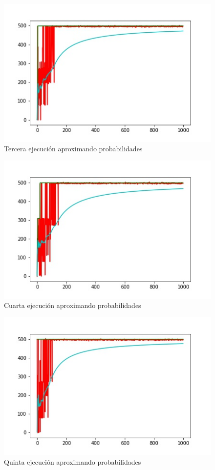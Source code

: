 \begin{figure}
  \centering
    \includegraphics[scale=0.9]{grafi3.jpg}
  \caption[Tercera ejecución]{Tercera ejecución aproximando probabilidades}
  \label{graf3}
\end{figure}
\begin{figure}
  \centering
    \includegraphics[scale=0.9]{grafi4.jpg}
  \caption[Cuarta ejecución]{Cuarta ejecución aproximando probabilidades}
  \label{graf4}
\end{figure}
\begin{figure}
  \centering
    \includegraphics[scale=0.9]{grafi5.jpg}
  \caption[Quinta ejecución]{Quinta ejecución aproximando probabilidades}
  \label{graf5}
\end{figure}
